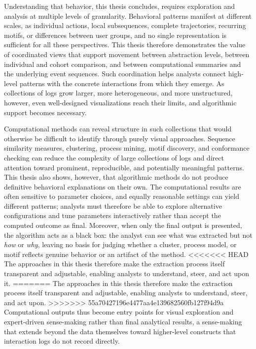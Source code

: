 Understanding that behavior, this thesis concludes, requires exploration and analysis at multiple levels of granularity.
Behavioral patterns manifest at different scales, as individual actions, local subsequences, complete trajectories, recurring motifs, or differences between user groups, and no single representation is sufficient for all these perspectives.
This thesis therefore demonstrates the value of coordinated views that support movement between abstraction levels, between individual and cohort comparison, and between computational summaries and the underlying event sequences.
Such coordination helps analysts connect high-level patterns with the concrete interactions from which they emerge.
As collections of logs grow larger, more heterogeneous, and more unstructured, however, even well-designed visualizations reach their limits, and algorithmic support becomes necessary.

Computational methods can reveal structure in such collections that would otherwise be difficult to identify through purely visual approaches.
Sequence similarity measures, clustering, process mining, motif discovery, and conformance checking can reduce the complexity of large collections of logs and direct attention toward prominent, reproducible, and potentially meaningful patterns.
This thesis also shows, however, that algorithmic methods do not produce definitive behavioral explanations on their own.
The computational results are often sensitive to parameter choices, and equally reasonable settings can yield different patterns; analysts must therefore be able to explore alternative configurations and tune parameters interactively rather than accept the computed outcome as final.
Moreover, when only the final output is presented, the algorithm acts as a black box: the analyst can see what was extracted but not \textit{how} or \textit{why}, leaving no basis for judging whether a cluster, process model, or motif reflects genuine behavior or an artifact of the method.
<<<<<<< HEAD
The approaches in this thesis therefore make the extraction process itself transparent and adjustable, enabling analysts to understand, steer, and act upon it.
=======
The approaches in this thesis therefore make the extraction process itself transparent and adjustable, enabling analysts to understand, steer, and act upon.
>>>>>>> 55a70427196e4477aa4e139682560fb127f94d9a
Computational outputs thus become entry points for visual exploration and expert-driven sense-making rather than final analytical results, a sense-making that extends beyond the data themselves toward higher-level constructs that interaction logs do not record directly.

